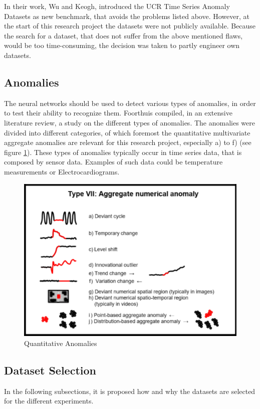 In their work, Wu and Keogh, introduced the UCR Time Series Anomaly Datasets as new benchmark, that avoids the problems listed above. However, at the start of this research project the datasets were not publicly available. Because the search for a dataset, that does not suffer from the above mentioned flaws, would be too time-consuming, the decision was taken to partly engineer own datasets.
\newline
\subsection{Anomalies}
The neural networks should be used to detect various types of anomalies, in order to test their ability to recognize them. Foorthuis \parencite{YEAR} compiled, in an extensive literature review, a study on the different types of anomalies. The anomalies were divided into different categories, of which foremost the quantitative multivariate aggregate anomalies are relevant for this research project, especially a) to f) (see figure \ref{fig:Anomaly_types}). These types of anomalies typically occur in time series data, that is composed by sensor data. Examples of such data could be temperature measurements or Electrocardiograms.

\begin{figure}[h]
	\centering
	\includegraphics[scale=0.6]{Figures/series_anomaly}
	\decoRule
	\caption[Quantitative Anomalies]{Quantitative Anomalies \parencite{Foorthuis}}
	\label{fig:Anomaly_types}
\end{figure}

\subsection{Dataset Selection}
In the following subsections, it is proposed how and why the datasets are selected for the different experiments.

